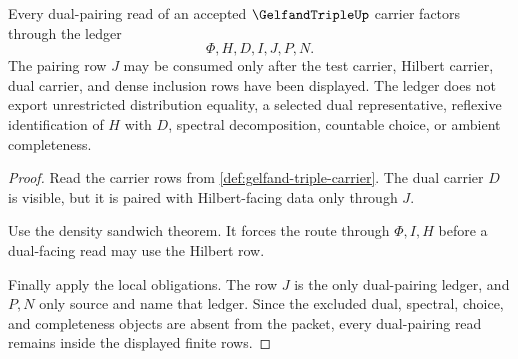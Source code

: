 \begin{theorem}
\label{thm:gelfand-triple-dual-pairing-ledger}
Every dual-pairing read of an accepted $\GelfandTripleUp$ carrier factors through the ledger
$$
\Phi,H,D,I,J,P,N .
$$
The pairing row $J$ may be consumed only after the test carrier, Hilbert carrier, dual carrier, and dense inclusion rows have been displayed. The ledger does not export unrestricted distribution equality, a selected dual representative, reflexive identification of $H$ with $D$, spectral decomposition, countable choice, or ambient completeness.
\end{theorem}
\begin{proof}
Read the carrier rows from \autoref{def:gelfand-triple-carrier}. The dual carrier $D$ is visible, but it is paired with Hilbert-facing data only through $J$.

Use the density sandwich theorem. It forces the route through $\Phi,I,H$ before a dual-facing read may use the Hilbert row.

Finally apply the local obligations. The row $J$ is the only dual-pairing ledger, and $P,N$ only source and name that ledger. Since the excluded dual, spectral, choice, and completeness objects are absent from the packet, every dual-pairing read remains inside the displayed finite rows.
\end{proof}

\begin{closurestatus}{\GelfandTripleUp}
  \theoryclosure{\seedClosure}
  \formalstatus{\unformalizedV}
\end{closurestatus}
